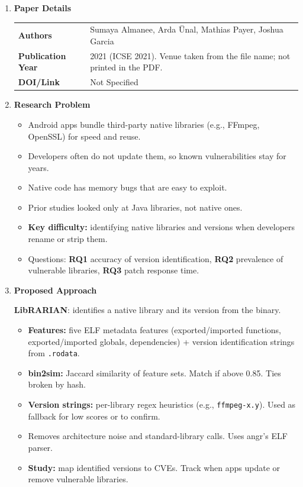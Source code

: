 \documentclass[11pt,a4paper]{article}
\newcommand{\entrypart}[1]{\textbf{\color{accent}#1}\par\vspace{2pt}}
\begin{document}
\begin{enumerate}

    \item \entrypart{Paper Details}

    \begin{tabular}{@{}>{\bfseries}p{3.2cm} p{11.5cm}@{}}
        Authors          & Sumaya Almanee, Arda \"Unal, Mathias Payer, Joshua Garcia \\[2pt]
        Publication Year & 2021 (ICSE 2021). Venue taken from the file name; not printed in the PDF. \\[2pt]
        DOI/Link         & Not Specified
    \end{tabular}

    \item \entrypart{Research Problem}

    \begin{itemize}
        \item Android apps bundle third-party native libraries (e.g., FFmpeg, OpenSSL) for speed and reuse.
        \item Developers often do not update them, so known vulnerabilities stay for years.
        \item Native code has memory bugs that are easy to exploit.
        \item Prior studies looked only at Java libraries, not native ones.
        \item \textbf{Key difficulty:} identifying native libraries and versions when developers rename or strip them.
        \item Questions: \textbf{RQ1} accuracy of version identification, \textbf{RQ2} prevalence of vulnerable libraries, \textbf{RQ3} patch response time.
    \end{itemize}

    \item \entrypart{Proposed Approach}

    \textbf{LibRARIAN}: identifies a native library and its version from the binary.

    \begin{itemize}
        \item \textbf{Features:} five ELF metadata features (exported/imported functions, exported/imported globals, dependencies) + version identification strings from \texttt{.rodata}.
        \item \textbf{bin2sim:} Jaccard similarity of feature sets. Match if above 0.85. Ties broken by hash.
        \item \textbf{Version strings:} per-library regex heuristics (e.g., \texttt{ffmpeg-x.y}). Used as fallback for low scores or to confirm.
        \item Removes architecture noise and standard-library calls. Uses angr's ELF parser.
        \item \textbf{Study:} map identified versions to CVEs. Track when apps update or remove vulnerable libraries.
    \end{itemize}


\end{enumerate}
\end{document}
